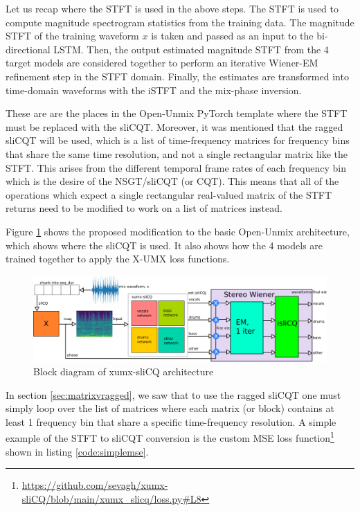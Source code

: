 \documentclass[report.tex]{subfiles}
\begin{document}
Let us recap where the STFT is used in the above steps. The STFT is used to compute magnitude spectrogram statistics from the training data. The magnitude STFT of the training waveform $x$ is taken and passed as an input to the bi-directional LSTM. Then, the output estimated magnitude STFT from the 4 target models are considered together to perform an iterative Wiener-EM refinement step in the STFT domain. Finally, the estimates are transformed into time-domain waveforms with the iSTFT and the mix-phase inversion.

These are are the places in the Open-Unmix PyTorch template where the STFT must be replaced with the sliCQT. Moreover, it was mentioned that the ragged sliCQT will be used, which is a list of time-frequency matrices for frequency bins that share the same time resolution, and not a single rectangular matrix like the STFT. This arises from the different temporal frame rates of each frequency bin which is the desire of the NSGT/sliCQT (or CQT). This means that all of the operations which expect a single rectangular real-valued matrix of the STFT returns need to be modified to work on a list of matrices instead.

Figure \ref{fig:xumxslicq} shows the proposed modification to the basic Open-Unmix architecture, which shows where the sliCQT is used. It also shows how the 4 models are trained together to apply the X-UMX loss functions.

\begin{figure}[ht]
	\centering
	\includegraphics[width=\textwidth]{./images-blockdiagrams/xumx_slicq_system_compressed.png}
	\caption{Block diagram of xumx-sliCQ architecture}
	\label{fig:xumxslicq}
\end{figure}

In section \ref{sec:matrixvragged}, we saw that to use the ragged sliCQT one must simply loop over the list of matrices where each matrix (or block) contains at least 1 frequency bin that share a specific time-frequency resolution. A simple example of the STFT to sliCQT conversion is the custom MSE loss function\footnote{\url{https://github.com/sevagh/xumx-sliCQ/blob/main/xumx_slicq/loss.py\#L8}} shown in listing \ref{code:simplemse}.
\end{document}
